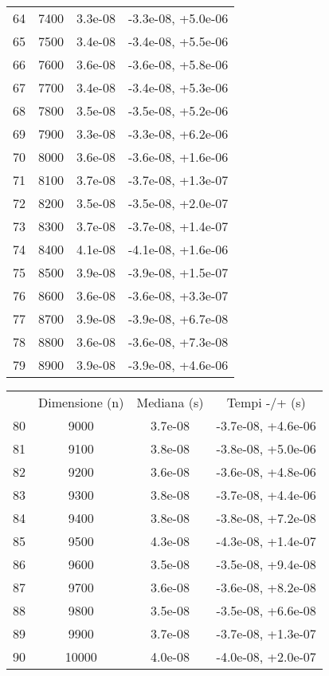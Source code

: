 \begin{table}
\begin{adjustbox}{width=1\textwidth/2}
\begin{tabular}{|c|c|c|c|}
\cline{1-4}
64 & 7400 & 3.3e-08 & -3.3e-08, +5.0e-06 \\
\cline{1-4}
65 & 7500 & 3.4e-08 & -3.4e-08, +5.5e-06 \\
\cline{1-4}
66 & 7600 & 3.6e-08 & -3.6e-08, +5.8e-06 \\
\cline{1-4}
67 & 7700 & 3.4e-08 & -3.4e-08, +5.3e-06 \\
\cline{1-4}
68 & 7800 & 3.5e-08 & -3.5e-08, +5.2e-06 \\
\cline{1-4}
69 & 7900 & 3.3e-08 & -3.3e-08, +6.2e-06 \\
\cline{1-4}
70 & 8000 & 3.6e-08 & -3.6e-08, +1.6e-06 \\
\cline{1-4}
71 & 8100 & 3.7e-08 & -3.7e-08, +1.3e-07 \\
\cline{1-4}
72 & 8200 & 3.5e-08 & -3.5e-08, +2.0e-07 \\
\cline{1-4}
73 & 8300 & 3.7e-08 & -3.7e-08, +1.4e-07 \\
\cline{1-4}
74 & 8400 & 4.1e-08 & -4.1e-08, +1.6e-06 \\
\cline{1-4}
75 & 8500 & 3.9e-08 & -3.9e-08, +1.5e-07 \\
\cline{1-4}
76 & 8600 & 3.6e-08 & -3.6e-08, +3.3e-07 \\
\cline{1-4}
77 & 8700 & 3.9e-08 & -3.9e-08, +6.7e-08 \\
\cline{1-4}
78 & 8800 & 3.6e-08 & -3.6e-08, +7.3e-08 \\
\cline{1-4}
79 & 8900 & 3.9e-08 & -3.9e-08, +4.6e-06 \\
\cline{1-4}
\end{tabular}
\end{adjustbox}
\end{table}

\begin{table}
\centering
\begin{adjustbox}{width=1\textwidth/2}
\begin{tabular}{|c|c|c|c|}
\hline
 & Dimensione (n) & Mediana (s) & Tempi -/+ (s) \\
80 & 9000 & 3.7e-08 & -3.7e-08, +4.6e-06 \\
\cline{1-4}
81 & 9100 & 3.8e-08 & -3.8e-08, +5.0e-06 \\
\cline{1-4}
82 & 9200 & 3.6e-08 & -3.6e-08, +4.8e-06 \\
\cline{1-4}
83 & 9300 & 3.8e-08 & -3.7e-08, +4.4e-06 \\
\cline{1-4}
84 & 9400 & 3.8e-08 & -3.8e-08, +7.2e-08 \\
\cline{1-4}
85 & 9500 & 4.3e-08 & -4.3e-08, +1.4e-07 \\
\cline{1-4}
86 & 9600 & 3.5e-08 & -3.5e-08, +9.4e-08 \\
\cline{1-4}
87 & 9700 & 3.6e-08 & -3.6e-08, +8.2e-08 \\
\cline{1-4}
88 & 9800 & 3.5e-08 & -3.5e-08, +6.6e-08 \\
\cline{1-4}
89 & 9900 & 3.7e-08 & -3.7e-08, +1.3e-07 \\
\cline{1-4}
90 & 10000 & 4.0e-08 & -4.0e-08, +2.0e-07 \\
\cline{1-4}
\end{tabular}
\end{adjustbox}
\end{table}

